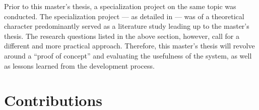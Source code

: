Prior to this master's thesis, a specialization project on the same topic was conducted. The specialization project --- as detailed in \citep{holmLLMsDeathGIS2023} --- was of a theoretical character predominantly served as a literature study leading up to the master's thesis. The research questions listed in the above section, however, call for a different and more practical approach. Therefore, this master's thesis will revolve around a \enquote{proof of concept} and evaluating the usefulness of the system, as well as lessons learned from the development process.



\section{Contributions}
\label{sec:intro-contributions}

\begin{comment}
This section just provides a brief summary of the main contributions of the work.
The main description of the contributions will come in Section~\ref{sec:contributions}, after the results are presented.
(Hence Section~\ref{sec:introContributions} can also be left out, leaving the discussion completely to Section~\ref{sec:contributions}.)

The format of this section will generally be as follows:

\begin{enumerate}
    \item \textit{Lorem ipsum dolor sit amet, consectetur adipiscing elit.}
    \item \textit{Lorem ipsum dolor sit amet, consectetur adipiscing elit.}
    \item \textit{Lorem ipsum dolor sit amet, consectetur adipiscing elit.}
\end{enumerate}

\noindent
where the items on the list briefly describe the key contributions.

The order of the contributions here is important. List your main contribution first!
Creating this list will help you not only with writing the Conclusion (where all items listed here definitely should be included, and in more detail),
but also with items that need to be mentioned in the Abstract, as well as with points that you will want to bring to attention in the Discussion.
Hence most of the content on this list will be addressed 4--5 times in your text: here, in the Abstract, Discussion, Conclusion, and (most likely)
in the Results chapter.
\end{comment}

